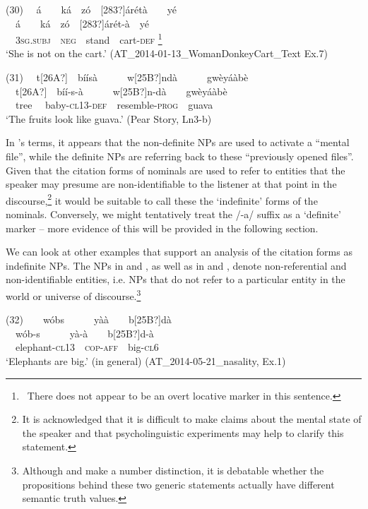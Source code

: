 \documentclass[output=paper]{langsci/langscibook}
\begin{document}
\ea\label{ex:teo:30}
\label{bkm:Ref432712923}\textup{(30) \ \ }á\ \ \ \ ká\ \ zó\ \ [283?]árétà\ \ \ \ yé\\
\gll \ \ á\ \ \ \ ká\ \ zó\ \ [283?]árét-à\ \ yé\\
\ \ 3\textsc{sg}\textsc{.subj}\ \ \textsc{neg}\ \ stand\ \ cart-\textsc{def}\textsuperscript{ }\footnote{\ There does not appear to be an overt locative marker in this sentence.}\ \ \\
\glt ‘She is not on the cart.’ (AT\_2014-01-13\_WomanDonkeyCart\_Text Ex.7)
\z

\ea\label{ex:teo:31}
\label{bkm:Ref432712925}\textup{(31) \ \ }t[26A?]\ \ bíísà\ \ \ \ \ \ w[25B?]ndà\ \ \ \ \ \ gwèyáàbè\\
\ \ t[26A?]\ \ bíí-s-à\ \ \ \ \ \ w[25B?]n-dà\ \ \ \ gwèyáàbè\\
\ \ tree \ \ baby\nobreakdash-\textsc{cl13-}\textsc{def}\ \ resemble-\textsc{prog}\ \ guava\\
\glt ‘The fruits look like guava.’ (Pear Story, Ln3-b)
\z

In \cite{DuBois1980}’s terms, it appears that the non-definite NPs are used to activate a “mental file”, while the definite NPs are referring back to these “previously opened files”. Given that the citation forms of nominals are used to refer to entities that the speaker may presume are non-identifiable to the listener at that point in the discourse,\footnote{It is acknowledged that it is difficult to make claims about the mental state of the speaker and that psycholinguistic experiments may help to clarify this statement.} it would be suitable to call these the ‘indefinite’ forms of the nominals. Conversely, we might tentatively treat the /-a/ suffix as a ‘definite’ marker – more evidence of this will be provided in the following section.

We can look at other examples that support an analysis of the citation forms as indefinite NPs. The NPs in  and , as well as in  and , denote non-referential and non-identifiable entities, i.e. NPs that do not refer to a particular entity in the world or universe of discourse.\footnote{Although  and  make a number distinction, it is debatable whether the propositions behind these two generic statements actually have different semantic truth values.}

\ea\label{ex:teo:32}
\label{bkm:Ref432677397}\textup{(32)\ \ \ \ }w\'{o}bs\ \ \ \ \ \ y\`{a}\`{a}\ \ \ \ b[25B?]d\`{a}\\
\gll \ \ w\'{o}b\nobreakdash-s\ \ \ \ \ \ y\`{a}-\`{a}\ \ \ \ b[25B?]d\nobreakdash-\`{a}\\
\ \ elephant\nobreakdash-\textsc{cl13\ \ cop-aff}\ \ big\nobreakdash-\textsc{cl6}\\
\glt ‘Elephants are big.’ (in general) (AT\_2014-05-21\_nasality, Ex.1)
\z
\end{document}
